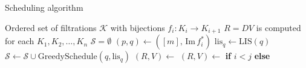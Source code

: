 \documentclass[sn-mathphys]{sn-jnl}
\begin{document}
\begin{algorithm}[h]
	\caption{Scheduling algorithm}\label{alg:schedule}
    \begin{algorithmic}[1]
    	\Require Ordered set of filtrations $\mathcal{K}$ with bijections $f_{i}: K_i \to K_{i+1}$
    	\Ensure $R = D V$ is computed for each  $K_1, K_2, \dots, K_n$
    		\State $\mathcal{S} = \emptyset$
    		    \State $(p, q) \gets ([m], \, \mathrm{Im}\, f^\ast_{i})$ 
    			\State $\mathrm{lis}_q \gets \mathrm{LIS}(q)$ 
    			\State $\mathcal{S} \gets \mathcal{S} \cup \mathrm{GreedySchedule}(q, \mathrm{lis}_q)$ 
    		\EndFor
	    	\State $(R, V) \gets$ 
	    		\State $(R, V) \gets$ \textbf{if} $i < j$  \textbf{else} 
	    	\EndFor
    	\EndProcedure
	\end{algorithmic}
\end{algorithm}

\end{document}
